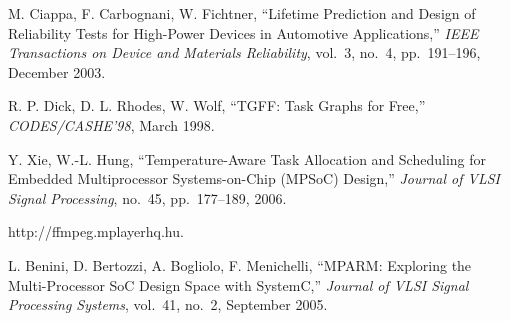\begin{thebibliography}{99}
    M. Ciappa, F. Carbognani, W. Fichtner,
    ``Lifetime Prediction and Design of Reliability Tests for High-Power Devices in Automotive Applications,''
    \emph{IEEE Transactions on Device and Materials Reliability},
    vol.~3, no.~4, pp.~191--196, December 2003.

    R. P. Dick, D. L. Rhodes, W. Wolf,
    ``TGFF: Task Graphs for Free,''
    \emph{CODES/CASHE'98},
    March 1998.

    Y. Xie, W.-L. Hung,
    ``Temperature-Aware Task Allocation and Scheduling for Embedded Multiprocessor Systems-on-Chip (MPSoC) Design,''
    \emph{Journal of VLSI Signal Processing},
    no.~45, pp.~177--189, 2006.

    http://ffmpeg.mplayerhq.hu.

    L. Benini, D. Bertozzi, A. Bogliolo, F. Menichelli,
    ``MPARM: Exploring the Multi-Processor SoC Design Space with SystemC,''
    \emph{Journal of VLSI Signal Processing Systems},
    vol.~41, no.~2, September 2005.
\end{thebibliography}
